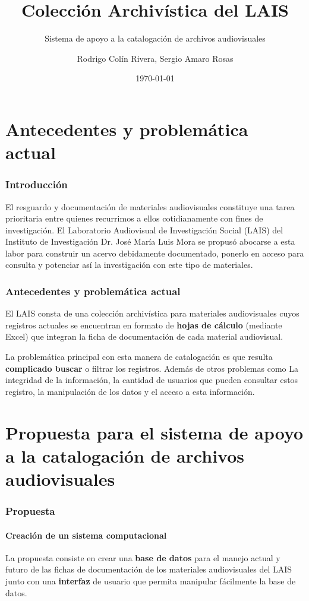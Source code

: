\documentclass{beamer}
\title{Colección Archivística del LAIS}
\subtitle{Sistema de apoyo a la catalogación de archivos audiovisuales}
\author{Rodrigo Colín Rivera, Sergio Amaro Rosas}
\institute
{
  Laboratorio Audiovisual de Investigación Social\\
  Instituto de Investigaciones Dr. José María Luis Mora
}
\date{\today}
\begin{document}
\frame{\titlepage} %

\section{Antecedentes y problemática actual}
\begin{frame}
	\frametitle{Introducción}
	El resguardo y documentación de materiales audiovisuales constituye una tarea prioritaria entre quienes recurrimos a ellos cotidianamente con fines de investigación. El Laboratorio Audiovisual de Investigación Social (LAIS) del Instituto de Investigación Dr. José María Luis Mora se propusó abocarse a esta labor para construir un acervo debidamente documentado, ponerlo en acceso para consulta y potenciar así la investigación con este tipo de materiales.
\end{frame}

\begin{frame}
	\frametitle{Antecedentes y problemática actual}
	El LAIS consta de una colección archivística para materiales audiovisuales cuyos registros actuales se encuentran en formato de \textbf{hojas de cálculo} (mediante Excel) que integran la ficha de documentación de cada material audiovisual.
	
	La problemática principal con esta manera de catalogación es que resulta \textbf{complicado buscar} o filtrar los registros. Además de otros problemas como La integridad de la información, la cantidad de usuarios que pueden consultar estos registro, la manipulación de los datos y el acceso a esta información.
\end{frame}

\section{Propuesta para el sistema de apoyo a la catalogación de archivos audiovisuales}
\begin{frame}
	\frametitle{Propuesta}
	\framesubtitle{Creación de un sistema computacional}
	
	La propuesta consiste en crear una \textbf{base de datos} para el manejo actual y futuro de las fichas de documentación de los materiales audiovisuales del LAIS junto con una \textbf{interfaz} de usuario que permita manipular fácilmente la base de datos.
\end{frame}
\end{document}
